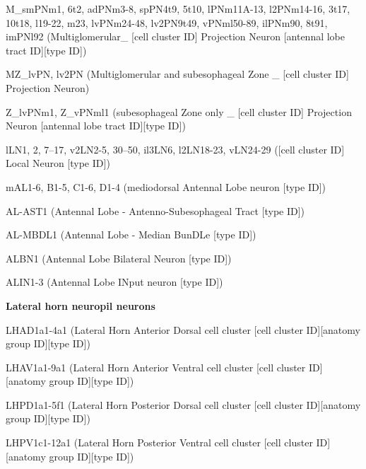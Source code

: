 \documentclass{article}
\begin{document}
{\noindent\hspace*{1.0em}M\_smPNm1, 6t2, adPNm3-8, spPN4t9, 5t10, lPNm11A-13, l2PNm14-16, 3t17, 10t18, l19-22, m23, lvPNm24-48, lv2PN9t49, vPNml50-89, ilPNm90, 8t91, imPNl92 (Multiglomerular\_ [cell cluster ID] Projection Neuron [antennal lobe tract ID][type ID])\par
\noindent\hspace*{1.0em}MZ\_lvPN, lv2PN (Multiglomerular and subesophageal Zone \_ [cell cluster ID] Projection Neuron)\par
\noindent\hspace*{1.0em}Z\_lvPNm1, Z\_vPNml1 (subesophageal Zone only \_ [cell cluster ID] Projection Neuron [antennal lobe tract ID][type ID])\par
\noindent\hspace*{1.0em}lLN1, 2, 7–17, v2LN2-5, 30–50, il3LN6, l2LN18-23, vLN24-29 ([cell cluster ID] Local Neuron [type ID])\par
\noindent\hspace*{1.0em}mAL1-6, B1-5, C1-6, D1-4 (mediodorsal Antennal Lobe neuron [type ID])\par
\noindent\hspace*{1.0em}AL-AST1 (Antennal Lobe - Antenno-Subesophageal Tract [type ID])\par
\noindent\hspace*{1.0em}AL-MBDL1 (Antennal Lobe - Median BunDLe [type ID])\par
\noindent\hspace*{1.0em}ALBN1 (Antennal Lobe Bilateral Neuron [type ID])\par
\noindent\hspace*{1.0em}ALIN1-3 (Antennal Lobe INput neuron [type ID])\par
\noindent\textbf{Lateral horn neuropil neurons}\par
\noindent\hspace*{1.0em}LHAD1a1-4a1 (Lateral Horn Anterior Dorsal cell cluster [cell cluster ID][anatomy group ID][type ID])\par
\noindent\hspace*{1.0em}LHAV1a1-9a1 (Lateral Horn Anterior Ventral cell cluster [cell cluster ID][anatomy group ID][type ID])\par
\noindent\hspace*{1.0em}LHPD1a1-5f1 (Lateral Horn Posterior Dorsal cell cluster [cell cluster ID][anatomy group ID][type ID])\par
\noindent\hspace*{1.0em}LHPV1c1-12a1 (Lateral Horn Posterior Ventral cell cluster [cell cluster ID][anatomy group ID][type ID])\par
}
\end{document}
